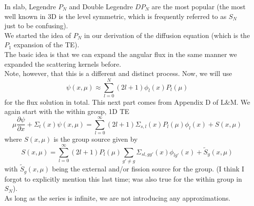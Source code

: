 \documentclass[12pt]{article}
\begin{document}
In slab, Legendre $P_N$ and Double Legendre $DP_N$ are the most popular (the most well known in 3D is the level symmetric, which is frequently referred to as $S_N$ just to be confusing). \\
We started the idea of $P_N$ in our derivation of the diffusion equation (which is the $P_1$ expansion of the TE). \\ 
The basic idea is that we can expand the angular flux in the same manner we expanded the scattering kernels before. \\
Note, however, that this is a different and distinct process. Now, we will use
\[
\psi(x, \mu) \approx \sum_{l=0}^N (2l+1)\phi_l(x)P_l(\mu)
\]
for the flux solution in total. This next part comes from Appendix D of L\&M. We again start with the within group, 1D TE
\[
\mu \frac{\partial \psi}{\partial x} + \Sigma_t(x)\psi(x,\mu) = \sum_{l=0}^{\infty} (2l+1) \Sigma_{s,l}(x) P_l(\mu)\phi_l(x) + S(x,\mu)
\]
where $S(x,\mu)$ is the group source given by
\[
S(x,\mu) = \sum_{l=0}^{\infty} (2l+1) P_l(\mu) \sum_{g' \neq g} \Sigma_{sl,gg'}(x) \phi_{lg'}(x) + \tilde{S}_g(x,\mu)
\]
with $\tilde{S}_g(x,\mu)$ being the external and/or fission source for the group. 
(I think I forgot to explicitly mention this last time; was also true for the within group in $S_N$).\\
As long as the series is infinite, we are not introducing any approximations.
\end{document}
